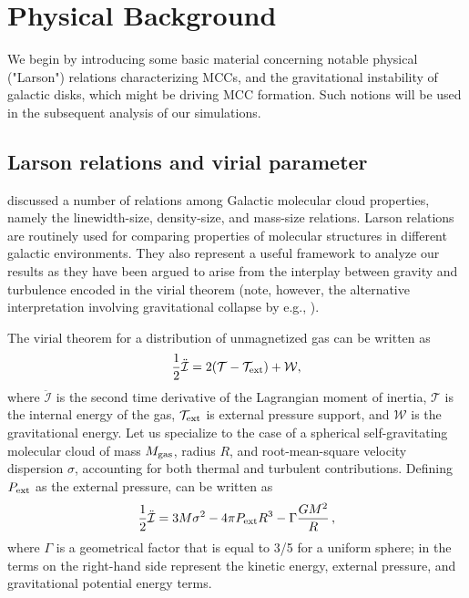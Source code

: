 \IfFileExists{emulateapjlegacy.cls}{\documentclass[iop]{emulateapjlegacy}}{\documentclass[iop]{emulateapj}}
\begin{document}
\section{Physical Background}\label{sec:Back}
We begin by introducing some basic material concerning notable physical ("Larson") relations characterizing MCCs, and the gravitational instability of galactic disks, which might be driving MCC formation. Such notions will be used in the subsequent analysis of our simulations.

\subsection{Larson relations and virial parameter}\label{sec:PVE}
\citet{Larson81a} discussed a number of relations among Galactic
molecular cloud
properties, namely the linewidth-size, density-size, and mass-size relations. Larson relations are routinely used for comparing properties of molecular structures in different galactic environments. They also represent a useful framework to analyze our results as they
have been argued to arise from the interplay between gravity and turbulence encoded in the virial theorem
(note, however, the alternative interpretation involving gravitational collapse by
e.g., \citealt{Ballesteros-Paredes11a}).

The virial theorem for a distribution of unmagnetized gas can be written as \citep{McKee92a}
\begin{equation}\label{eqn:virial_th_general}
\frac{1}{2}\ddot{\mathcal{I}} = 2(\mathcal{T} - \mathcal{T}_{\rm ext}) + \mathcal{W},
\end{equation}
where $\ddot{\mathcal{I}}$ is the second time derivative of the Lagrangian moment of inertia, $\mathcal{T}$ is the internal energy of the gas, $\mathcal{T}_{\rm ext}$ is external pressure support, and $\mathcal{W}$ is the gravitational energy.
%
Let us specialize to the case of a spherical self-gravitating molecular cloud of mass $M_{\rm gas}$, radius $R$, and root-mean-square velocity dispersion $\sigma$, accounting for both thermal and turbulent contributions.
Defining $P_{\rm ext}$ as the external pressure,  can be written as
\begin{equation}
\frac{1}{2}{\ddot{\mathcal{I}}} = 3 M \sigma^2 - 4\pi P_{\rm ext} R^3 - \Gamma\frac{GM^2}{R}\,,
\label{eqn:virial}
\end{equation}
where $\Gamma$ is a geometrical factor that is equal to 3/5 for a uniform sphere; in  the terms on the right-hand side represent the kinetic energy, external pressure, and gravitational potential energy terms.
\end{document}

